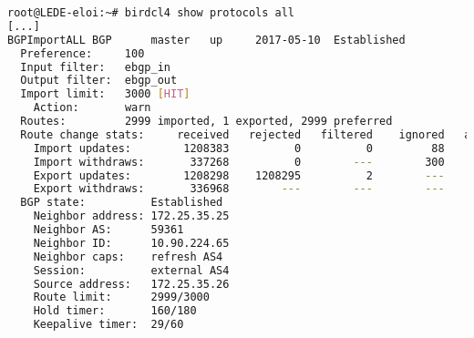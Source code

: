 \begin{lstlisting}[language=bash,caption={Bird BGP query.}]
root@LEDE-eloi:~# birdcl4 show protocols all
[...]
BGPImportALL BGP      master   up     2017-05-10  Established
  Preference:     100
  Input filter:   ebgp_in
  Output filter:  ebgp_out
  Import limit:   3000 [HIT]
    Action:       warn
  Routes:         2999 imported, 1 exported, 2999 preferred
  Route change stats:     received   rejected   filtered    ignored   accepted
    Import updates:        1208383          0          0         88    1208295
    Import withdraws:       337268          0        ---        300     336968
    Export updates:        1208298    1208295          2        ---          1
    Export withdraws:       336968        ---        ---        ---          0
  BGP state:          Established
    Neighbor address: 172.25.35.25
    Neighbor AS:      59361
    Neighbor ID:      10.90.224.65
    Neighbor caps:    refresh AS4
    Session:          external AS4
    Source address:   172.25.35.26
    Route limit:      2999/3000
    Hold timer:       160/180
    Keepalive timer:  29/60
\end{lstlisting}
